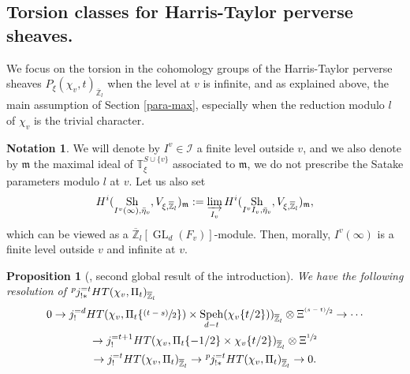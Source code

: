 \documentclass[JEP,XML,SOM,Unicode,published]{cedram}
\newcommand{\psfrac}[2]{\sfrac{(#1)}{#2}}
\DeclareMathOperator{\GL}{GL}
\theoremstyle{plain}
\newtheorem{prop}[equation]{Proposition}
\theoremstyle{definition}
\newtheorem{nota}[equation]{Notation}
\numberwithin{equation}{subsection}
\newcommand\Tm{{\mathbb T}}
\newcommand\Zm{{\mathbb Z}}
\newcommand\IC{{\mathcal I}}
\newcommand{\lexp}[2]{\kern \scriptspace \vphantom{#2}^{#1}\kern-\scriptspace#2}
\DeclareMathOperator{\sh}{Sh}
\DeclareMathOperator{\speh}{Speh}
\let \oo=\infty
\begin{document}
\subsection{Torsion classes for Harris-Taylor perverse sheaves.}
\label{para-torsion1}

We focus on the torsion in the cohomology groups of the Harris-Taylor perverse
sheaves $P_\xi(\chi_v,t)_{\overline \Zm_l}$ when the level at $v$ is infinite, and as explained above, \cf the main assumption of Section \ref{para-max},
especially when the reduction modulo $l$ of $\chi_v$ is the trivial character.

\begin{nota} \label{nota-mvw}
We will denote by $I^{v} \in \IC$ a finite
level outside $v$, and we also denote by
$\mathfrak m$ the maximal ideal of $\Tm^{S \cup \{v\} }_{\xi}$
associated to $\mathfrak m$, \ie we do not prescribe the Satake
parameters modulo $l$ at $v$.
Let us also set\vspace*{-3pt}
\[
H^i(\sh_{I^v(\oo),\bar \eta_v},V_{\xi,\overline \Zm_l})_{\mathfrak m}:=
\varinjlim_{{I_v}}
H^i(\sh_{I^vI_v,\bar \eta_v},V_{\xi,\overline \Zm_l})_{\mathfrak m},
\]
which can be viewed as a $\overline \Zm_l[\GL_d(F_v)]$-module.
Then, morally, $I^v(\oo)$ is a finite level outside $v$ and infinite at $v$.
\end{nota}

\begin{prop}[\cf \cite{boyer-duke}, second global result of the introduction]
We have
the following resolution of $\lexp p j_{!*}^{=t} HT(\chi_{v},\Pi_t)_{\overline \Zm_l}$\vspace*{-3pt}
\begin{multline} \label{eq-resolution0}
0 \to j_!^{=d} HT(\chi_{v},\Pi_t \{\psfrac{t-s}{2}\}) \times
\speh_{d-t}(\chi_{v}\{t/2\}))_{\overline \Zm_l}
\otimes \Xi^{\psfrac{s-t}{2}} \to \cdots \\
\to j_!^{=t+1} HT(\chi_{v},\Pi_t \{-1/2\} \times \chi_{v} \{t/2\})_{\overline \Zm_l}
\otimes \Xi^{\sfrac{1}{2}} \\
\to j_!^{=t} HT(\chi_{v},\Pi_t)_{\overline \Zm_l}
\to \lexp p j_{!*}^{=t} HT(\chi_{v},\Pi_t)_{\overline \Zm_l} \to 0.
\end{multline}
\end{prop}
\end{document}
